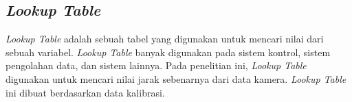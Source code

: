 \subsection{\emph{Lookup Table}}
\label{sec:lut}

\emph{Lookup Table} adalah sebuah tabel yang digunakan untuk mencari nilai dari sebuah variabel. \emph{Lookup Table} banyak digunakan pada sistem kontrol, sistem pengolahan data, dan sistem lainnya. Pada penelitian ini, \emph{Lookup Table} digunakan untuk mencari nilai jarak sebenarnya dari data kamera. \emph{Lookup Table} ini dibuat berdasarkan data kalibrasi. 